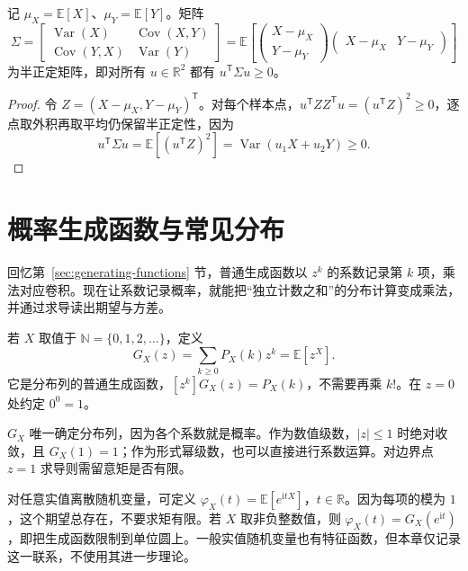 \documentclass[lang=cn,a4paper,fontset=none,zihao=false,10pt,openany,twoside]{beautybook}
\numberwithin{algorithm}{chapter}
\newcommand{\N}{\mathbb N}
\newcommand{\R}{\mathbb R}
\begin{document}
\begin{proposition}[协方差矩阵的半正定性]\label{prop:covariance-psd}
记 $\mu_X=\mathbb E[X]$、$\mu_Y=\mathbb E[Y]$。矩阵
\[
 \Sigma=\begin{bmatrix}\operatorname{Var}(X)&\operatorname{Cov}(X,Y)\\
 \operatorname{Cov}(Y,X)&\operatorname{Var}(Y)\end{bmatrix}
 =\mathbb E\left[\begin{pmatrix}X-\mu_X\\Y-\mu_Y\end{pmatrix}
 \begin{pmatrix}X-\mu_X&Y-\mu_Y\end{pmatrix}\right]
\]
为半正定矩阵，即对所有 $u\in\R^2$ 都有 $u^{\mathsf T}\Sigma u\ge0$。
\end{proposition}
\begin{proof}
令 $Z=(X-\mu_X,Y-\mu_Y)^{\mathsf T}$。对每个样本点，$u^{\mathsf T}ZZ^{\mathsf T}u=(u^{\mathsf T}Z)^2\ge0$，逐点取外积再取平均仍保留半正定性，因为
\[
 u^{\mathsf T}\Sigma u=\mathbb E[(u^{\mathsf T}Z)^2]
 =\operatorname{Var}(u_1X+u_2Y)\ge0.
\]
\end{proof}

\section{概率生成函数与常见分布}\label{sec:probability-pgf}
回忆第~\ref{sec:generating-functions} 节，普通生成函数以 $z^k$ 的系数记录第 $k$ 项，乘法对应卷积。现在让系数记录概率，就能把“独立计数之和”的分布计算变成乘法，并通过求导读出期望与方差。

\begin{definition}[概率生成函数]\label{def:probability-generating-function}
若 $X$ 取值于 $\N=\{0,1,2,\ldots\}$，定义
\[
 G_X(z)=\sum_{k\ge0}P_X(k)z^k=\mathbb E[z^X].
\]
它是分布列的普通生成函数，$[z^k]G_X(z)=P_X(k)$，不需要再乘 $k!$。在 $z=0$ 处约定 $0^0=1$。
\end{definition}
$G_X$ 唯一确定分布列，因为各个系数就是概率。作为数值级数，$|z|\le1$ 时绝对收敛，且 $G_X(1)=1$；作为形式幂级数，也可以直接进行系数运算。对边界点 $z=1$ 求导则需留意矩是否有限。

\begin{remark}[与特征函数的联系]
对任意实值离散随机变量，可定义 $\varphi_X(t)=\mathbb E[e^{\mathrm i tX}]$，$t\in\R$。因为每项的模为 $1$，这个期望总存在，不要求矩有限。若 $X$ 取非负整数值，则 $\varphi_X(t)=G_X(e^{\mathrm i t})$，即把生成函数限制到单位圆上。一般实值随机变量也有特征函数，但本章仅记录这一联系，不使用其进一步理论。
\end{remark}
\end{document}
